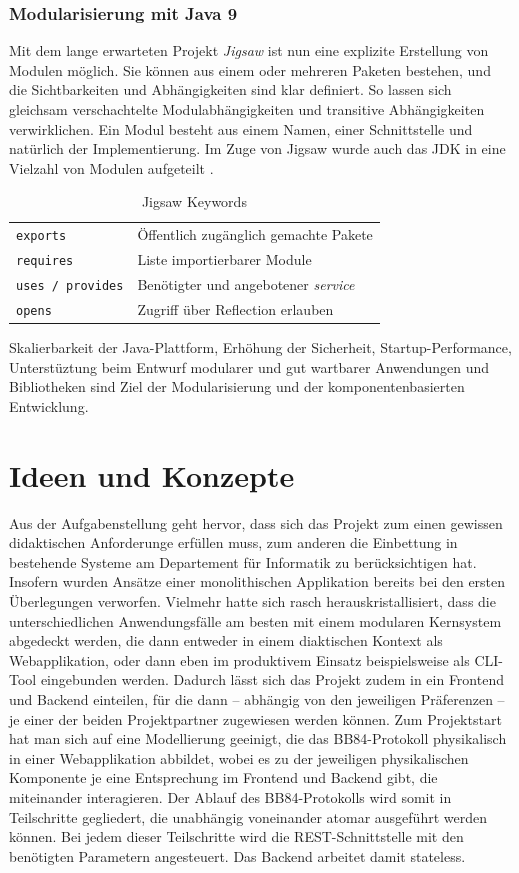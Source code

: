 \documentclass[a4paper,10.2pt,pdftex]{scrartcl}%
\begin{document}
\subsubsection{Modularisierung mit Java 9} 
Mit dem lange erwarteten Projekt \emph{Jigsaw} ist nun eine explizite Erstellung von Modulen möglich. Sie können aus einem oder mehreren Paketen bestehen, und die Sichtbarkeiten und Abhängigkeiten sind klar definiert. So lassen sich gleichsam verschachtelte Modulabhängigkeiten und transitive Abhängigkeiten verwirklichen. Ein Modul besteht aus einem Namen, einer Schnittstelle und natürlich der Implementierung. Im Zuge von Jigsaw wurde auch das JDK in eine Vielzahl von Modulen aufgeteilt \cite[S. 863]{inden}. 

\begin{table}
\hspace{1cm}
\begin{tabular}{ll}
\texttt{exports} & Öffentlich zugänglich gemachte Pakete \\
\texttt{requires} & Liste importierbarer Module \\
\texttt{uses / provides} & Benötigter und angebotener \emph{service} \\
\texttt{opens} & Zugriff über Reflection erlauben
\end{tabular} 
\caption{Jigsaw Keywords}
\end{table}

Skalierbarkeit der Java-Plattform, Erhöhung der Sicherheit, Startup-Performance, Unterstüztung beim Entwurf modularer und gut wartbarer Anwendungen und Bibliotheken sind Ziel der Modularisierung und der komponentenbasierten Entwicklung.



\section{Ideen und Konzepte}
Aus der Aufgabenstellung geht hervor, dass sich das Projekt zum einen gewissen didaktischen Anforderunge erfüllen muss, zum anderen die Einbettung in bestehende Systeme am Departement für Informatik zu berücksichtigen hat. Insofern wurden Ansätze einer monolithischen Applikation bereits bei den ersten Überlegungen verworfen. Vielmehr hatte sich rasch herauskristallisiert, dass die unterschiedlichen Anwendungsfälle am besten mit einem modularen Kernsystem abgedeckt werden, die dann entweder in einem diaktischen Kontext als Webapplikation, oder dann eben im produktivem Einsatz beispielsweise als CLI-Tool eingebunden werden. Dadurch lässt sich das Projekt zudem in ein Frontend und Backend einteilen, für die dann -- abhängig von den jeweiligen Präferenzen --  je einer der beiden Projektpartner zugewiesen werden können. Zum Projektstart hat man sich auf eine Modellierung geeinigt, die das BB84-Protokoll physikalisch in einer Webapplikation abbildet, wobei es zu der jeweiligen physikalischen Komponente je eine Entsprechung im Frontend und Backend gibt, die miteinander interagieren. Der Ablauf des BB84-Protokolls wird somit in Teilschritte gegliedert, die unabhängig voneinander atomar ausgeführt werden können. Bei jedem dieser Teilschritte wird die REST-Schnittstelle mit den benötigten Parametern angesteuert. Das Backend arbeitet damit stateless. 
\end{document}
